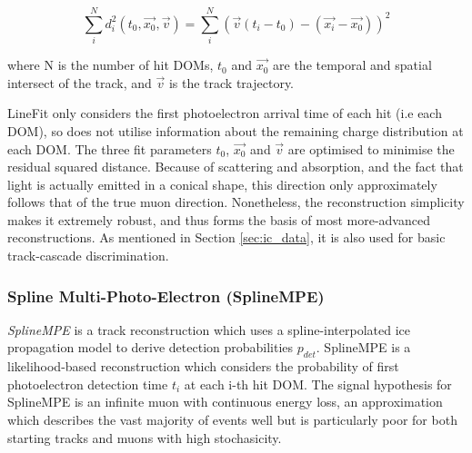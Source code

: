 \begin{equation}
	\sum^{N}_{i} d_{i}^{2}(t_{0}, \vec{x_{0}}, \vec{v})= \sum^{N}_{i}  \left( \vec{v}(t_{i} - t_{0}) - (\vec{x_{i}} - \vec{x_{0}}) \right)^{2}
\end{equation} 

where N is the number of hit DOMs, $t_{0}$ and $\vec{x_{0}}$ are the temporal and spatial intersect of the track, and $\vec{v}$ is the track trajectory. 

LineFit only considers the first photoelectron arrival time of each hit (i.e each DOM), so does not utilise information about the remaining charge distribution at each DOM. The three fit parameters $t_{0}$, $\vec{x_{0}}$ and $\vec{v}$ are optimised to minimise the residual squared distance. Because of scattering and absorption, and the fact that light is actually emitted in a conical shape, this direction only approximately follows that of the true muon direction. Nonetheless, the reconstruction simplicity makes it extremely robust, and thus forms the basis of most more-advanced reconstructions. As mentioned in Section \ref{sec:ic_data}, it is also used for basic track-cascade discrimination.

%
%
%

\subsubsection{Spline Multi-Photo-Electron (SplineMPE)}
 \emph{SplineMPE} is a track reconstruction which uses a spline-interpolated ice propagation model to derive detection probabilities $p_{det}$. SplineMPE is a likelihood-based reconstruction which considers the probability of first photoelectron detection time $t_{i}$ at each i-th hit DOM. The signal hypothesis for SplineMPE is an infinite muon with continuous energy loss, an approximation which describes the vast majority of events well but is particularly poor for both starting tracks and muons with high stochasicity.

